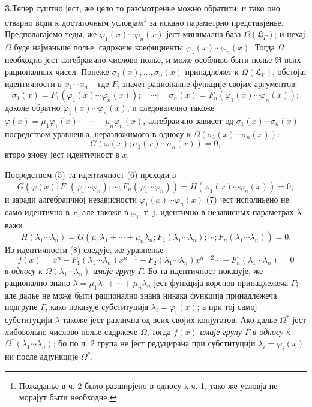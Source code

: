 ﻿\documentclass[11pt]{article}
\begin{document}
\noindent\textbf{3.}\quad Тепер суштно јест, же цело то разсмотренье можно обратити; и тако оно стварно води к достаточным условјам\footnote{Пожаданье в ч. 2 было разширјено в односу к ч. 1, тако же условја не морајут быти необходне.} за искано параметрно представјенье. Предполагајемо теды, же $\varphi_1(x)\cdots\varphi_n(x)$ јест минимална база $\Omega(\mathfrak L_\Gamma)$; и нехај $\Omega$ буде најманьше полье, садржече коефициенты $\varphi_1(x)\cdots\varphi_n(x)$. Тогда $\Omega$ необходно јест алгебраично числово полье, и може особливо быти полье $\mathfrak R$ всих рационалных чисел. Понеже $\sigma_1(x),\ldots,\sigma_n(x)$ принадлежет к $\Omega(\mathfrak L_\Gamma)$, обстојат идентичности в $x_1\cdots x_n$ -- где $F_i$ значет рационалне функције својих аргументов:
\begin{equation}
\sigma_1(x)=F_1(\varphi_1(x)\cdots\varphi_n(x));\quad \cdots;\quad
\sigma_n(x)=F_n(\varphi_1(x)\cdots\varphi_n(x));
\tag{5}
\end{equation}
доколе обратно $\varphi_1(x)\cdots\varphi_n(x)$, и следователно такоже $\varphi(x)=\mu_1\varphi_1(x)+\cdots+\mu_n\varphi_n(x)$, алгебраично зависет од $\sigma_1(x)\cdots\sigma_n(x)$ посредством уравненьа, неразложимого в односу к $\Omega(\sigma_1(x)\cdots\sigma_n(x))$:
\begin{equation}
G(\varphi(x);\sigma_1(x)\cdots\sigma_n(x))=0,
\tag{6}
\end{equation}
кторо знову јест идентичност в $x$.

Посредством (5) та идентичност (6) преходи в
\begin{equation}
G(\varphi(x);F_1(\varphi_1\cdots\varphi_n);\cdots;F_n(\varphi_1\cdots\varphi_n))
=H(\varphi_1(x)\cdots\varphi_n(x))=0;
\tag{7}
\end{equation}
и заради алгебраичној независности $\varphi_1(x)\cdots\varphi_n(x)$ (7) јест исполньено не само идентично в $x$, але такоже в $\varphi_i$; т. ј. идентично в независных параметрах $\lambda$ важи
\begin{equation}
H(\lambda_1\cdots\lambda_n)=G(\mu_1\lambda_1+\cdots+\mu_n\lambda_n;F_1(\lambda_1\cdots\lambda_n);\cdots;F_n(\lambda_1\cdots\lambda_n))=0.
\tag{8}
\end{equation}
Из идентичности (8) следује, же уравненье
\begin{equation}
f(x)=x^n-F_1(\lambda_1\cdots\lambda_n)x^{n-1}+F_2(\lambda_1\cdots\lambda_n)x^{n-2}\cdots\pm F_n(\lambda_1\cdots\lambda_n)=0
\tag{9}
\end{equation}
{\itshape в односу к} $\Omega(\lambda_1\cdots\lambda_n)$ {\itshape имаје групу} $\Gamma$. Бо та идентичност показује, же рационално знано $\lambda=\mu_1\lambda_1+\cdots+\mu_n\lambda_n$ јест функција коренов принадлежеча $\Gamma$; але далье не може быти рационално знана никака функција принадлежеча подгрупе $\Gamma$, како показује субституција $\lambda_i=\varphi_i(x)$; а при тој самој субституцији $\lambda$ такоже јест различна од всих својих конјугатов. Ако далье $\Omega^*$ јест либовольно числово полье садржече $\Omega$, тогда $f(x)$ {\itshape имаје групу} $\Gamma$ {\itshape в односу к} $\Omega^*(\lambda_1\cdots\lambda_n)$; бо по ч. 2 група не јест редуцирана при субституцији $\lambda_i=\varphi_i(x)$ ни после адјункције $\Omega^*$.
\end{document}
